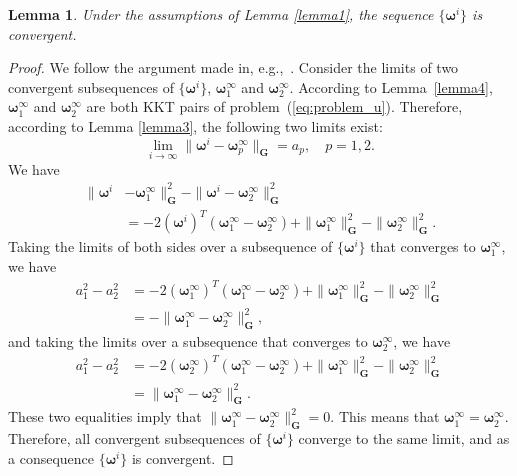 \documentclass[10pt,twocolumn,twoside]{IEEEtran}
\newcommand{\G}{\mathbf{G}} %
\newtheorem{lemma}{Lemma}
\begin{document}
\begin{lemma} \label{lemma5}
	Under the assumptions of Lemma \ref{lemma1}, the sequence $\{ \bm{\omega}^i \}$ is convergent.
\end{lemma}

\begin{proof}
	We follow the argument made in, e.g.,~\cite{Rockafellar1976, Chen1994}. Consider the limits of two convergent subsequences of $\{\bm{\omega}^i\}$, $\bm{\omega}^{\infty}_1$ and $\bm{\omega}^{\infty}_2$. According to Lemma~\ref{lemma4}, $\bm{\omega}^{\infty}_1$ and $\bm{\omega}^{\infty}_2$ are both KKT pairs of problem~(\ref{eq:problem_u}). Therefore, according to Lemma \ref{lemma3}, the following two limits exist:
	\begin{equation}
	\lim_{i \to \infty} \| \bm{\omega}^i - \bm{\omega}^{\infty}_p \|_{\G} = a_p, \quad p = 1,2.
	\end{equation}
	We have
	\begin{align*}
	\| \bm{\omega}^i& - \bm{\omega}^{\infty}_1 \|^2_{\G} - \| \bm{\omega}^i - \bm{\omega}^{\infty}_2 \|^2_{\G} \\
	& = -2 (\bm{\omega}^i)^T(\bm{\omega}^{\infty}_1 - \bm{\omega}^{\infty}_2) + \| \bm{\omega}^{\infty}_1 \|^2_{\G}  - \| \bm{\omega}^{\infty}_2 \|^2_{\G}.
	\end{align*}
	Taking the limits of both sides over a subsequence of $\{\bm{\omega}^i\}$ that converges to $\bm{\omega}^{\infty}_1$, we have
	\begin{align*}
	a_1^2 - a_2^2 & = -2 (\bm{\omega}^{\infty}_1)^T(\bm{\omega}^{\infty}_1 - \bm{\omega}^{\infty}_2) + \| \bm{\omega}^{\infty}_1 \|^2_{\G}  - \| \bm{\omega}^{\infty}_2 \|^2_{\G} \\
	& = - \| \bm{\omega}^{\infty}_1 - \bm{\omega}^{\infty}_2 \|^2_{\G},
	\end{align*}
	and taking the limits over a subsequence that converges to $\bm{\omega}^{\infty}_2$, we have
	\begin{align*}
	a_1^2 - a_2^2 & = -2 (\bm{\omega}^{\infty}_2)^T(\bm{\omega}^{\infty}_1 - \bm{\omega}^{\infty}_2) + \| \bm{\omega}^{\infty}_1 \|^2_{\G}  - \| \bm{\omega}^{\infty}_2 \|^2_{\G} \\
	& = \| \bm{\omega}^{\infty}_1 - \bm{\omega}^{\infty}_2 \|^2_{\G}.
	\end{align*}
	These two equalities imply that $\| \bm{\omega}^{\infty}_1 - \bm{\omega}^{\infty}_2 \|^2_{\G} = 0$. This means that $\bm{\omega}^{\infty}_1=\bm{\omega}^{\infty}_2$. Therefore, all convergent subsequences of $\{\bm{\omega}^i\}$ converge to the same limit, and as a consequence $\{\bm{\omega}^i\}$ is convergent.
\end{proof}
\end{document}
